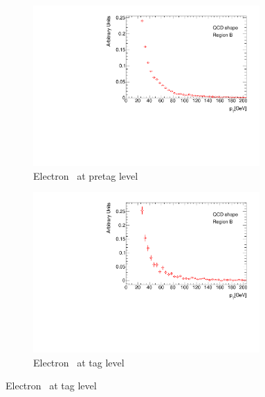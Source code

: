 \begin{figure}[htbp]
    \begin{subfigure}[b]{0.45\textwidth}
      \includegraphics[width=0.95\textwidth]{PartCrossSection/Plots/Electron/h_el_pretag_pt_wgt.pdf}
      \caption{Electron \pt\ at pretag level}\label{fig:CrossRegionBPrePt}
    \end{subfigure}
    \;
    \begin{subfigure}[b]{0.45\textwidth}
      \includegraphics[width=0.95\textwidth]{PartCrossSection/Plots/Electron/h_el_tag_pt_wgt.pdf}
      \caption{Electron \pt\ at tag level}\label{fig:CrossRegionBTagPt}
    \end{subfigure}


\end{figure}
